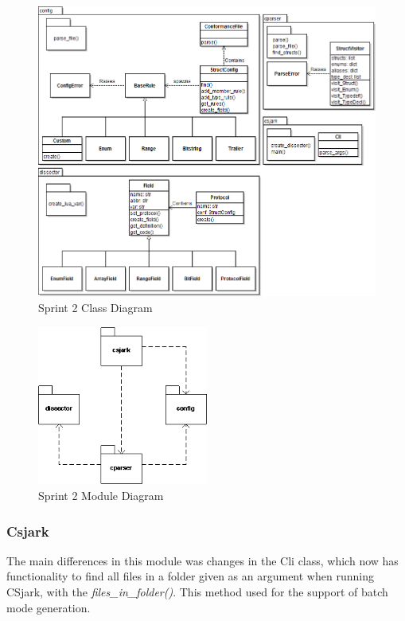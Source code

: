 \begin{figure}[htbp]
	\center
	\includegraphics[width=\textwidth]{./sprints/img/ClassDiagramSprint2v2}
	\caption{Sprint 2 Class Diagram\label{fig:sp2:class}}
\end{figure}

\begin{figure}[htbp]
	\center
	\includegraphics[width=0.5\textwidth]{./sprints/img/sp2modulediagram}
	\caption{Sprint 2 Module Diagram\label{fig:sp2:module}}
\end{figure}

\subsubsection{Csjark}
The main differences in this module was changes in the Cli class, which now 
has functionality to find all files in a folder given as an argument when 
running CSjark, with the \emph{files\_in\_folder()}. This method used for the 
support of batch mode generation.

